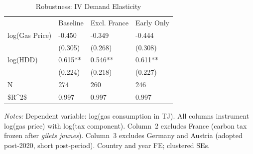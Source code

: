 \begin{table}[htbp]
\centering
\caption{Robustness: IV Demand Elasticity\label{tab:robustness}}
\begin{tabular}{llll}
& Baseline & Excl. France & Early Only \\
log(Gas Price) & -0.450 & -0.349 & -0.444 \\
& (0.305) & (0.268) & (0.308) \\
log(HDD) & 0.615** & 0.546** & 0.611** \\
& (0.224) & (0.218) & (0.227) \\
N & 274 & 260 & 246 \\
\$R\textasciicircum{}2\$ & 0.997 & 0.997 & 0.997 \\
\end{tabular}
\begin{minipage}{0.95\textwidth}
\vspace{0.3em}
\footnotesize \textit{Notes:} Dependent variable: log(gas consumption in TJ). All columns instrument log(gas price) with log(tax component). Column~2 excludes France (carbon tax frozen after \textit{gilets jaunes}). Column~3 excludes Germany and Austria (adopted post-2020, short post-period). Country and year FE; clustered SEs.
\end{minipage}
\end{table}

